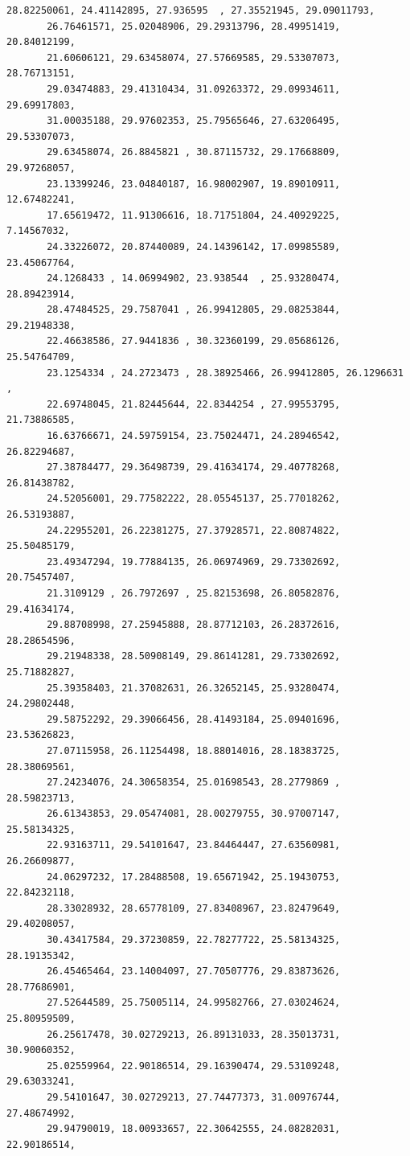\documentclass[11pt]{article}
\begin{document}
\begin{Verbatim}[commandchars=\\\{\}]
       28.82250061, 24.41142895, 27.936595  , 27.35521945, 29.09011793,
       26.76461571, 25.02048906, 29.29313796, 28.49951419, 20.84012199,
       21.60606121, 29.63458074, 27.57669585, 29.53307073, 28.76713151,
       29.03474883, 29.41310434, 31.09263372, 29.09934611, 29.69917803,
       31.00035188, 29.97602353, 25.79565646, 27.63206495, 29.53307073,
       29.63458074, 26.8845821 , 30.87115732, 29.17668809, 29.97268057,
       23.13399246, 23.04840187, 16.98002907, 19.89010911, 12.67482241,
       17.65619472, 11.91306616, 18.71751804, 24.40929225,  7.14567032,
       24.33226072, 20.87440089, 24.14396142, 17.09985589, 23.45067764,
       24.1268433 , 14.06994902, 23.938544  , 25.93280474, 28.89423914,
       28.47484525, 29.7587041 , 26.99412805, 29.08253844, 29.21948338,
       22.46638586, 27.9441836 , 30.32360199, 29.05686126, 25.54764709,
       23.1254334 , 24.2723473 , 28.38925466, 26.99412805, 26.1296631 ,
       22.69748045, 21.82445644, 22.8344254 , 27.99553795, 21.73886585,
       16.63766671, 24.59759154, 23.75024471, 24.28946542, 26.82294687,
       27.38784477, 29.36498739, 29.41634174, 29.40778268, 26.81438782,
       24.52056001, 29.77582222, 28.05545137, 25.77018262, 26.53193887,
       24.22955201, 26.22381275, 27.37928571, 22.80874822, 25.50485179,
       23.49347294, 19.77884135, 26.06974969, 29.73302692, 20.75457407,
       21.3109129 , 26.7972697 , 25.82153698, 26.80582876, 29.41634174,
       29.88708998, 27.25945888, 28.87712103, 26.28372616, 28.28654596,
       29.21948338, 28.50908149, 29.86141281, 29.73302692, 25.71882827,
       25.39358403, 21.37082631, 26.32652145, 25.93280474, 24.29802448,
       29.58752292, 29.39066456, 28.41493184, 25.09401696, 23.53626823,
       27.07115958, 26.11254498, 18.88014016, 28.18383725, 28.38069561,
       27.24234076, 24.30658354, 25.01698543, 28.2779869 , 28.59823713,
       26.61343853, 29.05474081, 28.00279755, 30.97007147, 25.58134325,
       22.93163711, 29.54101647, 23.84464447, 27.63560981, 26.26609877,
       24.06297232, 17.28488508, 19.65671942, 25.19430753, 22.84232118,
       28.33028932, 28.65778109, 27.83408967, 23.82479649, 29.40208057,
       30.43417584, 29.37230859, 22.78277722, 25.58134325, 28.19135342,
       26.45465464, 23.14004097, 27.70507776, 29.83873626, 28.77686901,
       27.52644589, 25.75005114, 24.99582766, 27.03024624, 25.80959509,
       26.25617478, 30.02729213, 26.89131033, 28.35013731, 30.90060352,
       25.02559964, 22.90186514, 29.16390474, 29.53109248, 29.63033241,
       29.54101647, 30.02729213, 27.74477373, 31.00976744, 27.48674992,
       29.94790019, 18.00933657, 22.30642555, 24.08282031, 22.90186514,

\end{Verbatim}
\end{document}
